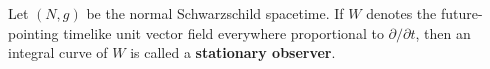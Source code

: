 Let $(N, g)$ be the normal Schwarzschild spacetime. If $W$ denotes the future-pointing timelike unit vector field everywhere proportional to $\partial/\partial t$, then an integral curve of $W$ is called a \textbf{stationary observer}.
